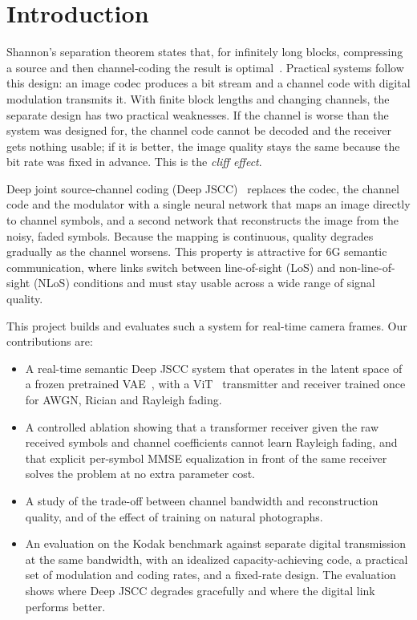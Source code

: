 \documentclass[conference]{IEEEtran}
\begin{document}
\section{Introduction}
Shannon's separation theorem states that, for infinitely long blocks, compressing a source and then channel-coding the result is optimal~\cite{shannon1948}. Practical systems follow this design: an image codec produces a bit stream and a channel code with digital modulation transmits it. With finite block lengths and changing channels, the separate design has two practical weaknesses. If the channel is worse than the system was designed for, the channel code cannot be decoded and the receiver gets nothing usable; if it is better, the image quality stays the same because the bit rate was fixed in advance. This is the \emph{cliff effect}.

Deep joint source-channel coding (Deep JSCC)~\cite{bourtsoulatze2019deep} replaces the codec, the channel code and the modulator with a single neural network that maps an image directly to channel symbols, and a second network that reconstructs the image from the noisy, faded symbols. Because the mapping is continuous, quality degrades gradually as the channel worsens. This property is attractive for 6G semantic communication, where links switch between line-of-sight (LoS) and non-line-of-sight (NLoS) conditions and must stay usable across a wide range of signal quality.

This project builds and evaluates such a system for real-time camera frames. Our contributions are:
\begin{itemize}
\item A real-time semantic Deep JSCC system that operates in the latent space of a frozen pretrained VAE~\cite{rombach2022ldm}, with a ViT~\cite{dosovitskiy2021vit} transmitter and receiver trained once for AWGN, Rician and Rayleigh fading.
\item A controlled ablation showing that a transformer receiver given the raw received symbols and channel coefficients cannot learn Rayleigh fading, and that explicit per-symbol MMSE equalization in front of the same receiver solves the problem at no extra parameter cost.
\item A study of the trade-off between channel bandwidth and reconstruction quality, and of the effect of training on natural photographs.
\item An evaluation on the Kodak benchmark against separate digital transmission at the same bandwidth, with an idealized capacity-achieving code, a practical set of modulation and coding rates, and a fixed-rate design. The evaluation shows where Deep JSCC degrades gracefully and where the digital link performs better.
\end{itemize}
\end{document}
